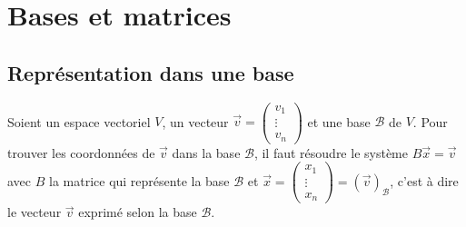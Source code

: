 \documentclass[10pt,a4paper]{book}
\begin{document}
\chapter{Bases et matrices}

\section{Représentation dans une base}
Soient un espace vectoriel $V$, un vecteur $\vec{v} = \begin{pmatrix} v_1 \\ \vdots \\ v_n \end{pmatrix}$ et une base $\mathcal{B}$ de $V$. Pour trouver les coordonnées de $\vec{v}$ dans la base $\mathcal{B}$, il faut résoudre le système $B\vec{x} = \vec{v}$ avec $B$ la matrice qui représente la base $\mathcal{B}$ et $\vec{x} = \begin{pmatrix} x_1 \\ \vdots \\ x_n \end{pmatrix} = (\vec{v})_\mathcal{B}$, c'est à dire le vecteur $\vec{v}$ exprimé selon la base $\mathcal{B}$.
\end{document}
